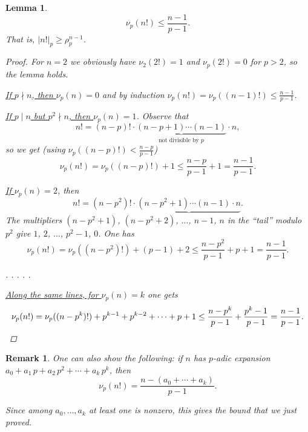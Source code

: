 \documentclass{article}
\theoremstyle{myplain}
\newtheorem{lemma}[proposition]{Lemma}
\theoremstyle{mydefinition}
\newtheorem{remark}[proposition]{Remark}
\begin{document}
\begin{lemma}
  $$\nu_p (n!) \le \frac{n-1}{p-1}.$$
  That is, $|n!|_p \ge \rho_p^{n-1}$.

  \begin{proof}
    For $n = 2$ we obviously have $\nu_2 (2!) = 1$ and $\nu_p (2!) = 0$ for
    $p > 2$, so the lemma holds.

    \noindent\underline{If $p \nmid n$, then $ \nu_p (n) = 0$} and by induction
    $ \nu_p (n!) = \nu_p ((n-1)!) \le \frac{n-1}{p-1}$.

    \vspace{1em}

    \noindent\underline{If $p \mid n$ but $p^2 \nmid n$, then $ \nu_p (n) = 1$}.
    Observe that
    $$n! = (n-p)! \cdot \underbrace{(n-p+1) \cdots (n-1) }_{\text{not divisible by }p}\cdot n,$$
    so we get (using $\nu_p ((n-p)!) < \frac{n-p}{p-1}$)
    $$\nu_p (n!) =  \nu_p ((n-p)!) + 1 \le \frac{n-p}{p-1} + 1 = \frac{n-1}{p-1}.$$

    \vspace{1em}

    \noindent\underline{If $ \nu_p (n) = 2$}, then
    $$n! = (n-p^2)! \cdot \underbrace{(n-p^2+1) \cdots (n-1) \cdot n}.$$
    The multipliers $(n-p^2+1)$, $(n-p^2+2)$, $\ldots$, $n-1$, $n$ in the
    ``tail'' modulo $p^2$ give $1$, $2$, $\ldots$, $p^2 - 1$, $0$. One has
    $$\nu_p (n!) =  \nu_p ((n-p^2)!) + (p-1) + 2 \le \frac{n-p^2}{p-1} + p + 1 = \frac{n-1}{p-1}.$$

    \vspace{1em}

    \noindent . . . . .

    \vspace{1em}

    \noindent\underline{Along the same lines, for $ \nu_p (n) = k$} one gets
    \[ \nu_p (n!) =
      \nu_p ((n-p^k)!) + p^{k-1} + p^{k-2} + \cdots + p + 1 \le
      \frac{n - p^k}{p-1} + \frac{p^k - 1}{p - 1} =
      \frac{n-1}{p-1}. \qedhere \]
  \end{proof}
\end{lemma}

\begin{remark}
  \label{remark:factorial-and-sum-of-digits}
  One can also show the following: if $n$ has $p$-adic expansion
  $a_0 + a_1\,p + a_2\,p^2 + \cdots + a_k\,p^k$, then
  $$\nu_p (n!) = \frac{n - (a_0 + \cdots + a_k)}{p-1}.$$

  Since among $a_0, \ldots, a_k$ at least one is nonzero, this gives the bound
  that we just proved.
\end{remark}
\end{document}
